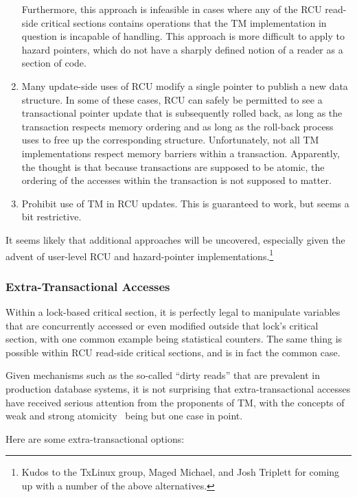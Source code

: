 \begin{enumerate}
	Furthermore, this approach is infeasible in cases where any of
	the RCU read-side critical sections contains operations that
	the TM implementation in question is incapable of handling.
	This approach is more difficult to apply to hazard pointers,
	which do not have a sharply defined notion of a reader as
	a section of code.
\item	Many update-side uses of RCU modify a single pointer to publish
	a new data structure.
	In some of these cases, RCU can safely be permitted to see a
	transactional pointer update that is subsequently rolled back,
	as long as the transaction respects memory ordering and as long
	as the roll-back process uses  to free up the
	corresponding structure.
	Unfortunately, not all TM implementations respect memory barriers
	within a transaction.
	Apparently, the thought is that because transactions are supposed
	to be atomic, the ordering of the accesses within the transaction
	is not supposed to matter.
\item	Prohibit use of TM in RCU updates.
	This is guaranteed to work, but seems a bit restrictive.
\end{enumerate}

It seems likely that additional approaches will be uncovered, especially
given the advent of user-level RCU and hazard-pointer
implementations.\footnote{
	Kudos to the TxLinux group, Maged Michael, and Josh Triplett
	for coming up with a number of the above alternatives.}

\subsubsection{Extra-Transactional Accesses}
\label{sec:future:Extra-Transactional Accesses}

Within a lock-based critical section, it is perfectly legal to manipulate
variables that are concurrently accessed or even modified outside that
lock's critical section, with one common example being statistical
counters.
The same thing is possible within RCU read-side critical
sections, and is in fact the common case.

Given mechanisms such as the so-called ``dirty reads'' that are
prevalent in production database systems, it is not surprising
that extra-transactional accesses have received serious attention
from the proponents of TM, with the concepts of weak and strong
atomicity~\cite{Blundell2006TMdeadlock} being but one case in point.

Here are some extra-transactional options:

